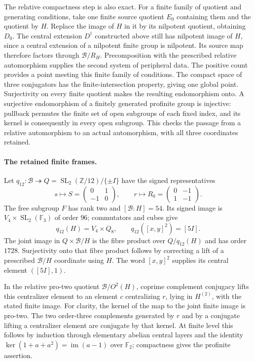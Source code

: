 The relative compactness step is also exact. For a finite family of quotient and generating conditions, take one finite source quotient $E_0$ containing them and the quotient by $H$. Replace the image of $H$ in it by its nilpotent quotient, obtaining $D_0$. The central extension $D^\dagger$ constructed above still has nilpotent image of $H$, since a central extension of a nilpotent finite group is nilpotent. Its source map therefore factors through $\mathcal B/R_H$. Precomposition with the prescribed relative automorphism supplies the second system of peripheral data. The positive count provides a point meeting this finite family of conditions. The compact space of three conjugators has the finite-intersection property, giving one global point. Surjectivity on every finite quotient makes the resulting endomorphism onto. A surjective endomorphism of a finitely generated profinite group is injective: pullback permutes the finite set of open subgroups of each fixed index, and its kernel is consequently in every open subgroup. This checks the passage from a relative automorphism to an actual automorphism, with all three coordinates retained.

\paragraph{The retained finite frames.}
Let $q_{12}:\mathcal B\twoheadrightarrow
Q=\operatorname{SL}_2(\mathbb Z/12)/\{\pm I\}$ have the signed representatives
\[
 s\longmapsto S=\begin{pmatrix}0&1\\-1&0\end{pmatrix},
 \qquad
 r\longmapsto R_0=\begin{pmatrix}0&-1\\1&-1\end{pmatrix}.
\]
The free subgroup $F$ has rank two and $[\mathcal B:H]=54$.
Its signed image is $V_4\times\operatorname{SL}_2(\mathbb F_3)$ of order $96$; commutators and cubes give
\[
 q_{12}(H)=V_4\times Q_8,\qquad
 q_{12}([x,y]^2)=[5I].
 \tag{A.L5}
\]
The joint image in $Q\times\mathcal B/H$ is the fibre product over $Q/q_{12}(H)$ and has order $1728$. Surjectivity onto that fibre product follows by correcting a lift of a prescribed $\mathcal B/H$ coordinate using $H$. The word $[x,y]^2$ supplies its central element $([5I],1)$.

In the relative pro-two quotient $\mathcal B/O^2(H)$, coprime complement conjugacy lifts this centralizer element to an element $c$ centralizing $r$, lying in $H^{(2)}$, with the stated finite image. For clarity, the kernel of the map to the joint finite image is pro-two. The two order-three complements generated by $r$ and by a conjugate lifting a centralizer element are conjugate by that kernel. At finite level this follows by induction through elementary abelian central layers and the identity $\ker(1+a+a^2)=\operatorname{im}(a-1)$ over $\mathbb F_2$; compactness gives the profinite assertion.

